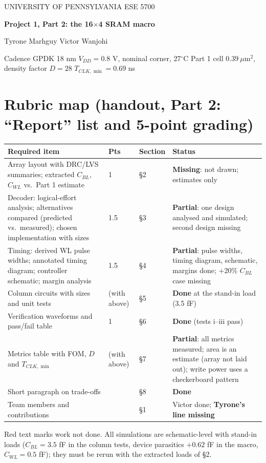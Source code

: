 \documentclass[10pt,letterpaper]{article}
\begin{document}
\begin{center}
{\small UNIVERSITY OF PENNSYLVANIA \quad ESE 5700}\par\vspace{4pt}
{\LARGE\bfseries Project 1, Part 2: the 16$\times$4 SRAM macro}\par\vspace{3pt}
Tyrone Marhguy \quad\textbullet\quad Victor Wanjohi\par\vspace{4pt}
\colorbox{pale}{\parbox{.95\linewidth}{\small\centering Cadence GPDK 18 nm \quad $V_{DD}=0.8$ V, nominal corner, 27$^\circ$C \quad Part 1 cell $0.39\ \mu$m$^2$, density factor $D=28$ \quad $T_{CLK,\min}=0.69$ ns}}
\end{center}

\section*{Rubric map (handout, Part 2: ``Report'' list and 5-point grading)}
\begin{tabularx}{\linewidth}{@{}p{.5\linewidth}p{.07\linewidth}p{.13\linewidth}X@{}}
\toprule Required item & Pts & Section & Status\\\midrule
\rowcolor{missc}Array layout with DRC/LVS summaries; extracted $C_{BL}$, $C_{WL}$ vs.\ Part 1 estimate & 1 & \S2 & \textbf{Missing}: not drawn; estimates only\\
\rowcolor{partc}Decoder: logical-effort analysis; alternatives compared (predicted vs.\ measured); chosen implementation with sizes & 1.5 & \S3 & \textbf{Partial}: one design analysed and simulated; second design missing\\
\rowcolor{partc}Timing: derived WL pulse widths; annotated timing diagram; controller schematic; margin analysis & 1.5 & \S4 & \textbf{Partial}: pulse widths, timing diagram, schematic, margins done; $+20\%$ $C_{BL}$ case missing\\
\rowcolor{okc}Column circuits with sizes and unit tests & (with above) & \S5 & \textbf{Done} at the stand-in load (3.5 fF)\\
\rowcolor{okc}Verification waveforms and pass/fail table & 1 & \S6 & \textbf{Done} (tests i--iii pass)\\
\rowcolor{partc}Metrics table with FOM, $D$ and $T_{CLK,\min}$ & (with above) & \S7 & \textbf{Partial}: all metrics measured; area is an estimate (array not laid out); write power uses a checkerboard pattern\\
\rowcolor{okc}Short paragraph on trade-offs & & \S8 & \textbf{Done}\\
\rowcolor{okc}Team members and contributions & & \S1 & Victor done; \textbf{Tyrone's line missing}\\\bottomrule
\end{tabularx}
\smallskip
{\small Red text marks work not done. All simulations are schematic-level with stand-in loads ($C_{BL}=3.5$ fF in the column tests, device parasitics $+0.62$ fF in the macro, $C_{WL}=0.5$ fF); they must be rerun with the extracted loads of \S2.}
\end{document}
